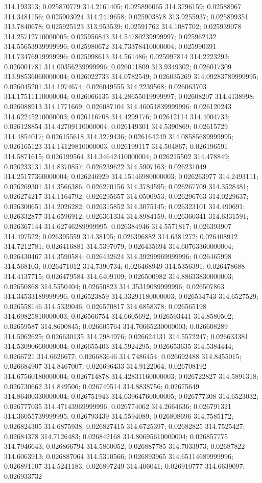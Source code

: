 314.193313; 0.025870779 314.2161405; 0.025896065 314.3796159; 0.02588967 314.3481156; 0.025903024 314.2419658; 0.025903878 313.9255937; 0.025899351 313.7840678; 0.025925123 313.953539; 0.02591762 314.1087702; 0.025939078 314.25712710000005; 0.025956843 314.54780239999997; 0.025962132 314.55653939999996; 0.025980672 314.73378410000004; 0.025990391 314.73476919999996; 0.025998613 314.561486; 0.025997814 314.2223293; 0.026001781 314.00356239999996; 0.026011809 313.9349302; 0.026017309 313.98536060000004; 0.026022733 314.0782549; 0.026035269 314.09283789999995; 0.026045201 314.1974674; 0.026049555 314.2239568; 0.026063703 314.17511110000004; 0.026066135 314.28655019999997; 0.02608207 314.4138998; 0.026088913 314.1771669; 0.026087104 314.46051839999996; 0.026120243 314.62245210000003; 0.026116708 314.4299176; 0.02612114 314.4004733; 0.026128854 314.42709110000004; 0.026149301 314.5390869; 0.02615729 314.4854017; 0.026155618 314.3279436; 0.026164249 314.08585689999995; 0.026165123 314.14129810000003; 0.026199117 314.504867; 0.026196591 314.5871615; 0.026199564 314.34642410000004; 0.026215502 314.478849; 0.026233131 314.8370857; 0.026239622 314.5907163; 0.026231049 314.25177360000004; 0.026246929 314.15146980000003; 0.026263977 314.2493111; 0.026269301 314.3566386; 0.026270156 314.3784595; 0.026267709 314.3528481; 0.026274217 314.1164792; 0.026295657 314.0500953; 0.026296763 314.0229637; 0.026300651 314.2026282; 0.026315852 314.3075145; 0.026323101 314.490691; 0.026332877 314.6596912; 0.026361334 314.8984159; 0.026360341 314.6331591; 0.026367144 314.62746289999995; 0.026384946 314.5571817; 0.026393907 314.497522; 0.026395559 314.38195; 0.026396882 314.6381272; 0.026408912 314.7212781; 0.026416881 314.5397079; 0.026435694 314.60763360000004; 0.026430467 314.3590584; 0.026432624 314.39299969999996; 0.026465998 314.568103; 0.026471012 314.7390734; 0.026468949 314.5356391; 0.026478688 314.4137715; 0.026479584 314.6409109; 0.026500982 314.88633830000003; 0.02650868 314.5550404; 0.02650823 314.35319089999996; 0.026507863 314.34533189999996; 0.026523859 314.33291180000003; 0.026534743 314.6527529; 0.026558146 314.5339046; 0.026570817 314.6858378; 0.026565198 314.69825810000003; 0.026566754 314.6605692; 0.026593441 314.8580502; 0.02659587 314.8600845; 0.026605764 314.70665230000003; 0.026608289 314.5962625; 0.026630135 314.7984976; 0.026624131 314.5572247; 0.026633381 314.53090660000004; 0.026655403 314.5924295; 0.026653635 314.5384444; 0.0266721 314.6626677; 0.026683646 314.7486454; 0.026692488 314.8455015; 0.026684907 314.8467007; 0.026696433 314.9122064; 0.026708192 314.67560180000004; 0.026714878 314.42831160000003; 0.026722827 314.5891318; 0.026730662 314.849506; 0.026749514 314.8838756; 0.02675649 314.86400330000004; 0.026751943 314.63964760000005; 0.026777308 314.6523032; 0.026777035 314.47143969999996; 0.026774062 314.2664636; 0.026791321 314.36055739999995; 0.026793439 314.5594089; 0.026808696 314.7585172; 0.026824305 314.6875938; 0.026827415 314.6725397; 0.02682825 314.7525427; 0.02684378 314.7126483; 0.026842168 314.80695610000004; 0.026857775 314.7946643; 0.026866794 314.5860052; 0.026887785 314.7033973; 0.02687822 314.6063913; 0.026887064 314.5310566; 0.026893965 314.65114689999996; 0.026891107 314.5241183; 0.026897249 314.406041; 0.026910777 314.6639097; 0.026933732 
